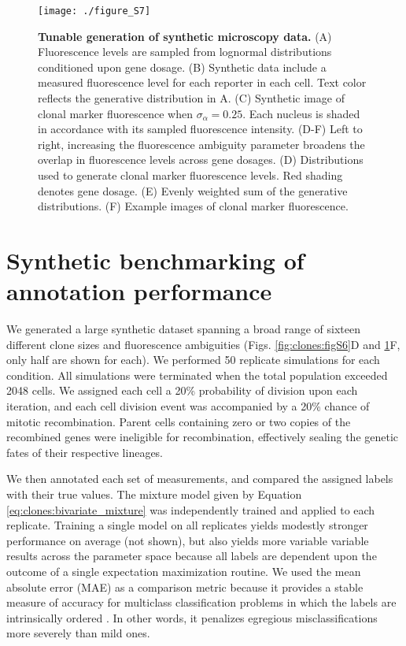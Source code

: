 \begin{figure}[h]
\texttt{[image: ./figure\_S7]}
\caption[Tunable generation of synthetic microscopy data.]{\textbf{Tunable generation of synthetic microscopy data.} (A) Fluorescence levels are sampled from lognormal distributions conditioned upon gene dosage. (B) Synthetic data include a measured fluorescence level for each reporter in each cell. Text color reflects the generative distribution in A. (C) Synthetic image of clonal marker fluorescence when $\sigma_{\alpha}=0.25$. Each nucleus is shaded in accordance with its sampled fluorescence intensity. (D-F) Left to right, increasing the fluorescence ambiguity parameter broadens the overlap in fluorescence levels across gene dosages. (D) Distributions used to generate clonal marker fluorescence levels. Red shading denotes gene dosage. (E) Evenly weighted sum of the generative distributions. (F) Example images of clonal marker fluorescence.}
\label{fig:clones:figS7}
\end{figure}

\section{Synthetic benchmarking of annotation performance}
\label{ch:clones:benchmarking}

We generated a large synthetic dataset spanning a broad range of sixteen different clone sizes and fluorescence ambiguities (Figs. \ref{fig:clones:figS6}D and \ref{fig:clones:figS7}F, only half are shown for each). We performed 50 replicate simulations for each condition. All simulations were terminated when the total population exceeded 2048 cells. We assigned each cell a 20\% probability of division upon each iteration, and each cell division event was accompanied by a 20\% chance of mitotic recombination. Parent cells containing zero or two copies of the recombined genes were ineligible for recombination, effectively sealing the genetic fates of their respective lineages. 

We then annotated each set of measurements, and compared the assigned labels with their true values. The mixture model given by Equation \ref{eq:clones:bivariate_mixture} was independently trained and applied to each replicate. Training a single model on all replicates yields modestly stronger performance on average (not shown), but also yields more variable variable results across the parameter space because all labels are dependent upon the outcome of a single expectation maximization routine. We used the mean absolute error (MAE) as a comparison metric because it provides a stable measure of accuracy for multiclass classification problems in which the labels are intrinsically ordered \cite{Gaudette2009}. In other words, it penalizes egregious misclassifications more severely than mild ones.

